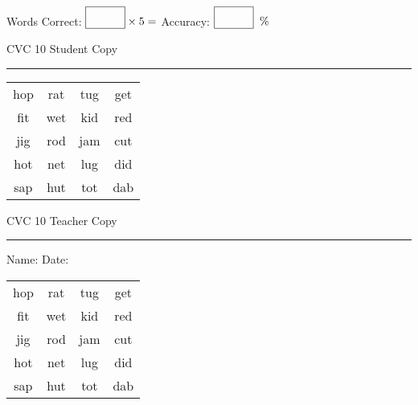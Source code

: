 \documentclass{memoir}
\begin{document}
\normalsize

Words Correct: $\fbox{\phantom{\huge 100}} \times 5 = $ Accuracy: $\fbox{\phantom{\huge 100}}\;\; \%$ 

\vfill

\newpage


\footnotesize \noindent
CVC 10 \hfill Student Copy
\smallskip
\hrule

\huge

\setlength{\tabcolsep}{14pt}
\def\arraystretch{2}

{\selectfont


\begin{vplace}[0.5]
\begin{center}
\begin{tabular}{cccc}
hop & rat & tug & get \\
fit & wet & kid & red \\
jig & rod & jam & cut \\
hot & net & lug & did \\
sap & hut & tot & dab \\
\end{tabular}
\end{center}
\end{vplace}

}

\newpage

\footnotesize \noindent
CVC 10 \hfill Teacher Copy
\smallskip
\hrule

\normalsize

\vfill

\noindent
Name: \underline{\hspace{1.75in}} \hfill Date: \underline{\hspace{1in}}

\huge

{\selectfont


\begin{vplace}[0.5]
\begin{center}
\begin{tabular}{cccc}
hop & rat & tug & get \\
fit & wet & kid & red \\
jig & rod & jam & cut \\
hot & net & lug & did \\
sap & hut & tot & dab \\
\end{tabular}
\end{center}
\end{vplace}



}
\end{document}
